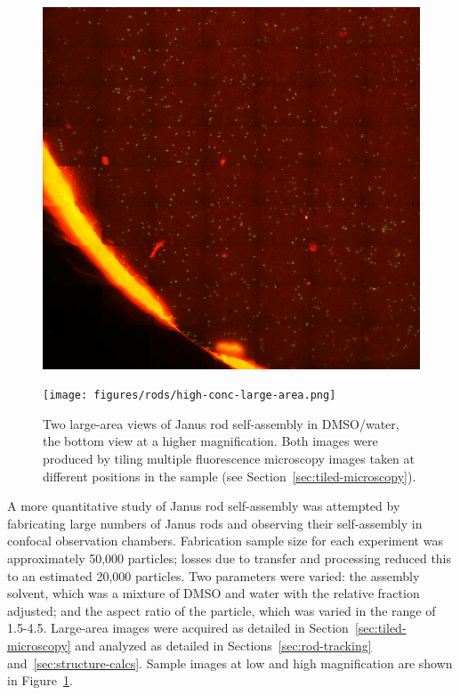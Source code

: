 \begin{figure}
\begin{center}
\includegraphics[width=0.5\linewidth]{figures/rods/janus-tiled-large-area.jpg} \\

\vspace{12pt}

\texttt{[image: figures/rods/high-conc-large-area.png]}
\end{center}
\caption{
Two large-area views of Janus rod self-assembly in DMSO/water, the bottom view at
a higher magnification. Both images were produced by tiling multiple fluorescence
microscopy images taken at different positions in the sample (see Section~\ref{sec:tiled-microscopy}).}
\label{fig:large-area}
\end{figure}



A more quantitative study of Janus rod self-assembly was attempted by fabricating large 
numbers of Janus rods and observing their self-assembly in confocal observation chambers.
Fabrication sample size for each experiment was approximately 50,000 particles; losses
due to transfer and processing reduced this to an estimated 20,000 particles.
Two parameters were varied: the assembly solvent, which was a mixture of DMSO and water
with the relative fraction adjusted; and the aspect ratio of the particle, which was varied
in the range of 1.5-4.5.  Large-area images were acquired as detailed in 
Section~\ref{sec:tiled-microscopy} and analyzed as detailed in Sections~\ref{sec:rod-tracking}
and~\ref{sec:structure-calcs}.  Sample images at low and high magnification are shown
in Figure~\ref{fig:large-area}.

